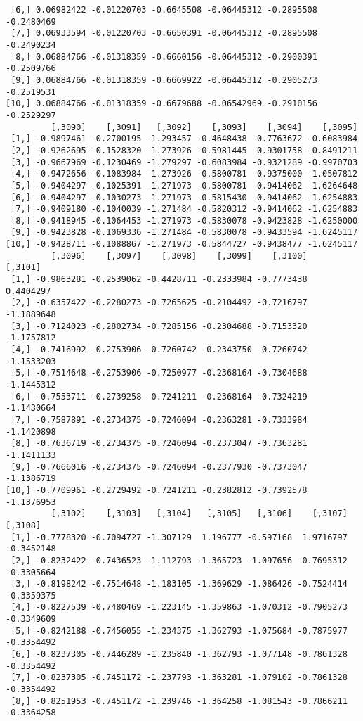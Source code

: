 \documentclass[
  letterpaper,
  DIV=11,
  numbers=noendperiod]{scrreprt}
\begin{document}
\begin{verbatim}
 [6,] 0.06982422 -0.01220703 -0.6645508 -0.06445312 -0.2895508 -0.2480469
 [7,] 0.06933594 -0.01220703 -0.6650391 -0.06445312 -0.2895508 -0.2490234
 [8,] 0.06884766 -0.01318359 -0.6660156 -0.06445312 -0.2900391 -0.2509766
 [9,] 0.06884766 -0.01318359 -0.6669922 -0.06445312 -0.2905273 -0.2519531
[10,] 0.06884766 -0.01318359 -0.6679688 -0.06542969 -0.2910156 -0.2529297
         [,3090]    [,3091]   [,3092]    [,3093]    [,3094]    [,3095]
 [1,] -0.9897461 -0.2700195 -1.293457 -0.4648438 -0.7763672 -0.6083984
 [2,] -0.9262695 -0.1528320 -1.273926 -0.5981445 -0.9301758 -0.8491211
 [3,] -0.9667969 -0.1230469 -1.279297 -0.6083984 -0.9321289 -0.9970703
 [4,] -0.9472656 -0.1083984 -1.273926 -0.5800781 -0.9375000 -1.0507812
 [5,] -0.9404297 -0.1025391 -1.271973 -0.5800781 -0.9414062 -1.6264648
 [6,] -0.9404297 -0.1030273 -1.271973 -0.5815430 -0.9414062 -1.6254883
 [7,] -0.9409180 -0.1040039 -1.271484 -0.5820312 -0.9414062 -1.6254883
 [8,] -0.9418945 -0.1064453 -1.271973 -0.5830078 -0.9423828 -1.6250000
 [9,] -0.9423828 -0.1069336 -1.271484 -0.5830078 -0.9433594 -1.6245117
[10,] -0.9428711 -0.1088867 -1.271973 -0.5844727 -0.9438477 -1.6245117
         [,3096]    [,3097]    [,3098]    [,3099]    [,3100]    [,3101]
 [1,] -0.9863281 -0.2539062 -0.4428711 -0.2333984 -0.7773438  0.4404297
 [2,] -0.6357422 -0.2280273 -0.7265625 -0.2104492 -0.7216797 -1.1889648
 [3,] -0.7124023 -0.2802734 -0.7285156 -0.2304688 -0.7153320 -1.1757812
 [4,] -0.7416992 -0.2753906 -0.7260742 -0.2343750 -0.7260742 -1.1533203
 [5,] -0.7514648 -0.2753906 -0.7250977 -0.2368164 -0.7304688 -1.1445312
 [6,] -0.7553711 -0.2739258 -0.7241211 -0.2368164 -0.7324219 -1.1430664
 [7,] -0.7587891 -0.2734375 -0.7246094 -0.2363281 -0.7333984 -1.1420898
 [8,] -0.7636719 -0.2734375 -0.7246094 -0.2373047 -0.7363281 -1.1411133
 [9,] -0.7666016 -0.2734375 -0.7246094 -0.2377930 -0.7373047 -1.1386719
[10,] -0.7709961 -0.2729492 -0.7241211 -0.2382812 -0.7392578 -1.1376953
         [,3102]    [,3103]   [,3104]   [,3105]   [,3106]    [,3107]    [,3108]
 [1,] -0.7778320 -0.7094727 -1.307129  1.196777 -0.597168  1.9716797 -0.3452148
 [2,] -0.8232422 -0.7436523 -1.112793 -1.365723 -1.097656 -0.7695312 -0.3305664
 [3,] -0.8198242 -0.7514648 -1.183105 -1.369629 -1.086426 -0.7524414 -0.3359375
 [4,] -0.8227539 -0.7480469 -1.223145 -1.359863 -1.070312 -0.7905273 -0.3349609
 [5,] -0.8242188 -0.7456055 -1.234375 -1.362793 -1.075684 -0.7875977 -0.3354492
 [6,] -0.8237305 -0.7446289 -1.235840 -1.362793 -1.077148 -0.7861328 -0.3354492
 [7,] -0.8237305 -0.7451172 -1.237793 -1.363281 -1.079102 -0.7861328 -0.3354492
 [8,] -0.8251953 -0.7451172 -1.239746 -1.364258 -1.081543 -0.7866211 -0.3364258

\end{verbatim}
\end{document}
